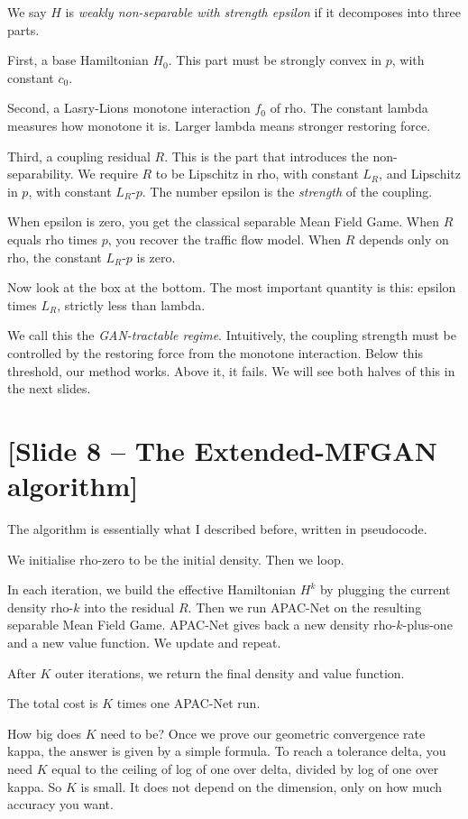 \documentclass[11pt]{article}
\begin{document}
We say $H$ is \emph{weakly non-separable with strength epsilon} if it
decomposes into three parts.

First, a base Hamiltonian $H_0$. This part must be strongly convex in $p$,
with constant $c_0$.

Second, a Lasry-Lions monotone interaction $f_0$ of rho. The constant lambda
measures how monotone it is. Larger lambda means stronger restoring force.

Third, a coupling residual $R$. This is the part that introduces the
non-separability. We require $R$ to be Lipschitz in rho, with constant $L_R$,
and Lipschitz in $p$, with constant $L_R$-$p$. The number epsilon is the
\emph{strength} of the coupling.

When epsilon is zero, you get the classical separable Mean Field Game. When
$R$ equals rho times $p$, you recover the traffic flow model. When $R$ depends
only on rho, the constant $L_R$-$p$ is zero.

Now look at the box at the bottom. The most important quantity is this:
epsilon times $L_R$, strictly less than lambda.

We call this the \emph{GAN-tractable regime}. Intuitively, the coupling
strength must be controlled by the restoring force from the monotone
interaction. Below this threshold, our method works. Above it, it fails.
We will see both halves of this in the next slides.

\section*{[Slide 8 -- The Extended-MFGAN algorithm]}

The algorithm is essentially what I described before, written in pseudocode.

We initialise rho-zero to be the initial density. Then we loop.

In each iteration, we build the effective Hamiltonian $H^k$ by plugging the
current density rho-$k$ into the residual $R$. Then we run APAC-Net on the
resulting separable Mean Field Game. APAC-Net gives back a new density
rho-$k$-plus-one and a new value function. We update and repeat.

After $K$ outer iterations, we return the final density and value function.

The total cost is $K$ times one APAC-Net run.

How big does $K$ need to be? Once we prove our geometric convergence rate
kappa, the answer is given by a simple formula. To reach a tolerance delta,
you need $K$ equal to the ceiling of log of one over delta, divided by log
of one over kappa. So $K$ is small. It does not depend on the dimension,
only on how much accuracy you want.
\end{document}
